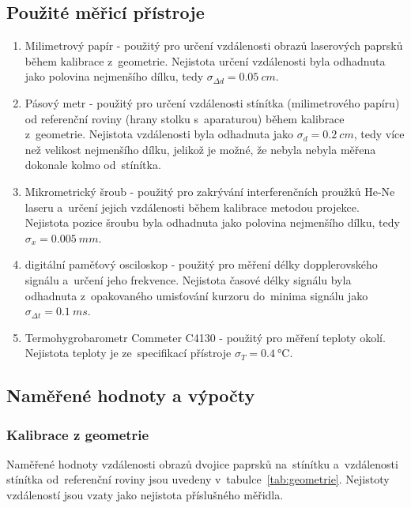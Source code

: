 \documentclass{../concepts/titul_zprava_p/prepareprotokolZprava} %
\begin{document}
\subsection{Použité měřicí přístroje}
\begin{enumerate}
    \item Milimetrový papír - použitý pro určení vzdálenosti obrazů laserových paprsků během kalibrace z~geometrie.
    Nejistota určení vzdálenosti byla odhadnuta jako polovina nejmenšího dílku, tedy $\sigma_{\Delta d} = \qty{0.05}{cm}$.
    \item Pásový metr - použitý pro určení vzdálenosti stínítka (milimetrového papíru) od referenční roviny (hrany stolku 
    s~aparaturou) během kalibrace z~geometrie. Nejistota vzdálenosti byla odhadnuta jako $\sigma_d = \qty{0.2}{cm}$, 
    tedy více než velikost nejmenšího dílku, jelikož je možné, že nebyla nebyla měřena dokonale kolmo od~stínítka.
    \item Mikrometrický šroub - použitý pro zakrývání interferenčních proužků He-Ne laseru a~určení jejich vzdálenosti během
    kalibrace metodou projekce. Nejistota pozice šroubu byla odhadnuta jako polovina nejmenšího dílku, tedy 
    $\sigma_x = \qty{0.005}{mm}$.
    \item digitální paměťový osciloskop - použitý pro měření délky dopplerovského signálu a~určení jeho frekvence. Nejistota
    časové délky signálu byla odhadnuta z~opakovaného umisťování kurzoru do~minima signálu jako $\sigma_{\Delta t} = \qty{0.1}{ms}$.
    \item Termohygrobarometr Commeter C4130 - použitý pro měření teploty okolí. Nejistota teploty je 
    ze~specifikací přístroje $\sigma_T = \qty{0.4}{\degreeCelsius}$.

\end{enumerate}

\subsection{Naměřené hodnoty a výpočty}

\subsubsection{Kalibrace z geometrie}

Naměřené hodnoty vzdálenosti obrazů dvojice paprsků na~stínítku a~vzdálenosti stínítka od~referenční roviny jsou uvedeny
v~tabulce~\ref{tab:geometrie}. Nejistoty vzdáleností jsou vzaty jako nejistota příslušného měřidla.
\end{document}

